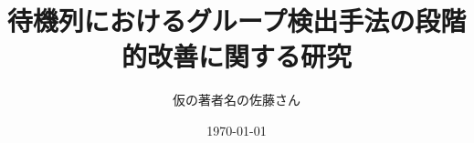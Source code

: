 \documentclass[autodetect-engine, ja=standard, a4paper, 11pt]{bxjsarticle}
\title{\Huge 待機列におけるグループ検出手法の段階的改善に関する研究}
\author{\Large 仮の著者名の佐藤さん}
\date{\today}
\begin{document}
\maketitle



\tableofcontents
\clearpage


\clearpage




\nocite{*}

\end{document}
